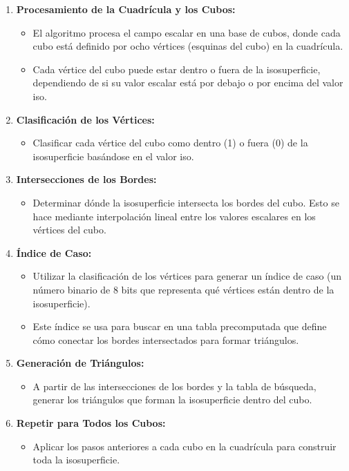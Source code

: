 \documentclass{article}
\begin{document}
\begin{enumerate}
    \item \textbf{Procesamiento de la Cuadrícula y los Cubos:}
    \begin{itemize}
        \item El algoritmo procesa el campo escalar en una base de cubos, donde cada cubo está definido por ocho vértices (esquinas del cubo) en la cuadrícula.
        \item Cada vértice del cubo puede estar dentro o fuera de la isosuperficie, dependiendo de si su valor escalar está por debajo o por encima del valor iso.
    \end{itemize}
    \item \textbf{Clasificación de los Vértices:}
    \begin{itemize}
        \item Clasificar cada vértice del cubo como dentro (1) o fuera (0) de la isosuperficie basándose en el valor iso.
    \end{itemize}
    \item \textbf{Intersecciones de los Bordes:}
    \begin{itemize}
        \item Determinar dónde la isosuperficie intersecta los bordes del cubo. Esto se hace mediante interpolación lineal entre los valores escalares en los vértices del cubo.
    \end{itemize}
    \item \textbf{Índice de Caso:}
    \begin{itemize}
        \item Utilizar la clasificación de los vértices para generar un índice de caso (un número binario de 8 bits que representa qué vértices están dentro de la isosuperficie).
        \item Este índice se usa para buscar en una tabla precomputada que define cómo conectar los bordes intersectados para formar triángulos.
    \end{itemize}
    \item \textbf{Generación de Triángulos:}
    \begin{itemize}
        \item A partir de las intersecciones de los bordes y la tabla de búsqueda, generar los triángulos que forman la isosuperficie dentro del cubo.
    \end{itemize}
    \item \textbf{Repetir para Todos los Cubos:}
    \begin{itemize}
        \item Aplicar los pasos anteriores a cada cubo en la cuadrícula para construir toda la isosuperficie.
    \end{itemize}
\end{enumerate}
\end{document}
